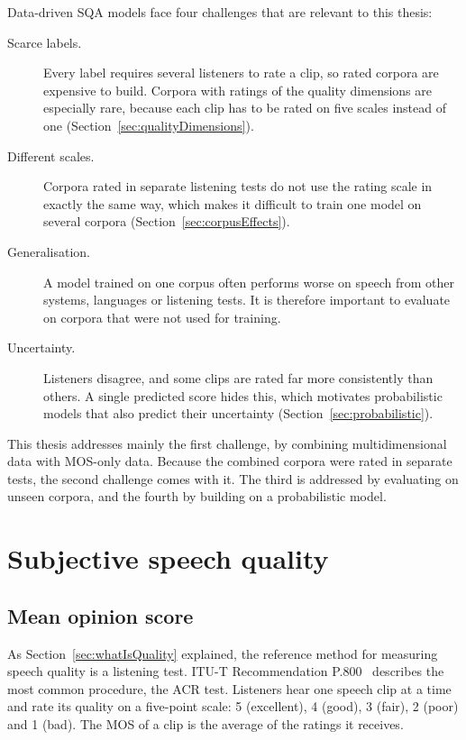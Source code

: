 \documentclass[
english,                 %
bibtex,                  %
includeExtraAbstracts, %
]{kththesis}
\numberwithin{listing}{chapter}
\begin{document}
Data-driven SQA models face four challenges that are relevant to this thesis:
\begin{description}
\item[Scarce labels.] Every label requires several listeners to rate a clip, so rated corpora are expensive to build. Corpora with ratings of the quality dimensions are especially rare, because each clip has to be rated on five scales instead of one (Section~\ref{sec:qualityDimensions}).
\item[Different scales.] Corpora rated in separate listening tests do not use the rating scale in exactly the same way, which makes it difficult to train one model on several corpora (Section~\ref{sec:corpusEffects}).
\item[Generalisation.] A model trained on one corpus often performs worse on speech from other systems, languages or listening tests. It is therefore important to evaluate on corpora that were not used for training.
\item[Uncertainty.] Listeners disagree, and some clips are rated far more consistently than others. A single predicted score hides this, which motivates probabilistic models that also predict their uncertainty (Section~\ref{sec:probabilistic}).
\end{description}
This thesis addresses mainly the first challenge, by combining multidimensional data with MOS-only data. Because the combined corpora were rated in separate tests, the second challenge comes with it. The third is addressed by evaluating on unseen corpora, and the fourth by building on a probabilistic model.

\section{Subjective speech quality}
\label{sec:subjectiveQuality}

\subsection{Mean opinion score}

As Section~\ref{sec:whatIsQuality} explained, the reference method for measuring speech quality is a listening test. ITU-T Recommendation P.800~\cite{itu_p800} describes the most common procedure, the \gls{ACR} test. Listeners hear one speech clip at a time and rate its quality on a five-point scale: 5 (excellent), 4 (good), 3 (fair), 2 (poor) and 1 (bad). The \gls{MOS} of a clip is the average of the ratings it receives. 
\end{document}
